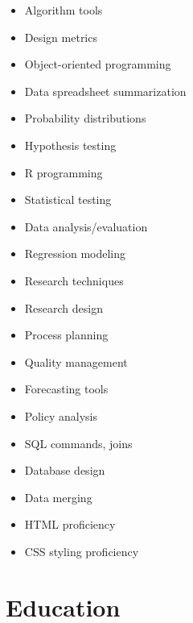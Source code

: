 \documentclass[
  letterpaper,
  DIV=11,
  numbers=noendperiod]{scrartcl}
\providecommand{\tightlist}{%
  \setlength{\itemsep}{0pt}\setlength{\parskip}{0pt}}\usepackage{longtable,booktabs,array}
\begin{document}
\begin{itemize}
\tightlist
\item
  Algorithm tools\\
\item
  Design metrics\\
\item
  Object-oriented programming\\
\item
  Data spreadsheet summarization\\
\item
  Probability distributions\\
\item
  Hypothesis testing\\
\item
  R programming\\
\item
  Statistical testing\\
\item
  Data analysis/evaluation\\
\item
  Regression modeling\\
\item
  Research techniques\\
\item
  Research design\\
\item
  Process planning\\
\item
  Quality management\\
\item
  Forecasting tools\\
\item
  Policy analysis\\
\item
  SQL commands, joins\\
\item
  Database design\\
\item
  Data merging\\
\item
  HTML proficiency\\
\item
  CSS styling proficiency
\end{itemize}

\section{Education}\label{education}
\end{document}
